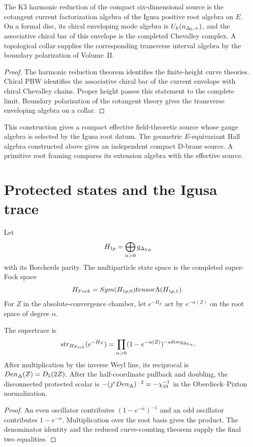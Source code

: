 \begin{corollary}
The K3 harmonic reduction of the compact six-dimensional source is the cotangent current factorization algebra of the Igusa positive root algebra on $E$.  On a formal disc, its chiral enveloping mode algebra is $U_h({n_{\Delta_5,+}})$, and the associative chiral bar of this envelope is the completed Chevalley complex.  A topological collar supplies the corresponding transverse interval algebra by the boundary polarization of Volume~II.
\end{corollary}
\begin{proof}
The harmonic reduction theorem identifies the finite-height curve theories.  Chiral PBW identifies the associative chiral bar of the current envelope with chiral Chevalley chains.  Proper height passes this statement to the complete limit.  Boundary polarization of the cotangent theory gives the transverse enveloping algebra on a collar.
\end{proof}

This construction gives a compact effective field-theoretic source whose gauge algebra is selected by the Igusa root datum.  The geometric $E$-equivariant Hall algebra constructed above gives an independent compact D-brane source.  A primitive root framing compares its extension algebra with the effective source.

\chapter{Protected states and the Igusa trace}
Let
\[
 H_{1p}
 =\bigoplus_{\alpha>0}{g_{\Delta_5}}_\alpha
\]
with its Borcherds parity.  The multiparticle state space is the completed super-Fock space
\[
 H_{Fock}=Sym(H_{1p,0})
 tensor\Lambda(H_{1p,1}).
\]
For $Z$ in the absolute-convergence chamber, let $e^{-H_Z}$ act by $e^{-\alpha(Z)}$ on the root space of degree $\alpha$.

\begin{theorem}
The supertrace is
\[
 str_{H_{Fock}}(e^{-H_Z})
 =\prod_{\alpha>0}
 (1-e^{-\alpha(Z)})^{-sdim{g_{\Delta_5}}_\alpha}.
\]
After multiplication by the inverse Weyl line, its reciprocal is $Den_{\Delta}(Z)=D_5(2Z)$.  After the half-coordinate pullback and doubling, the disconnected protected scalar is $-(\jmath^*Den_{\Delta})^{-2}=-\chi_{10}^{-1}$ in the Oberdieck--Pixton normalization.
\end{theorem}
\begin{proof}
An even oscillator contributes $(1-e^{-\alpha})^{-1}$ and an odd oscillator contributes $1-e^{-\alpha}$.  Multiplication over the root basis gives the product.  The denominator identity and the reduced curve-counting theorem supply the final two equalities.
\end{proof}

